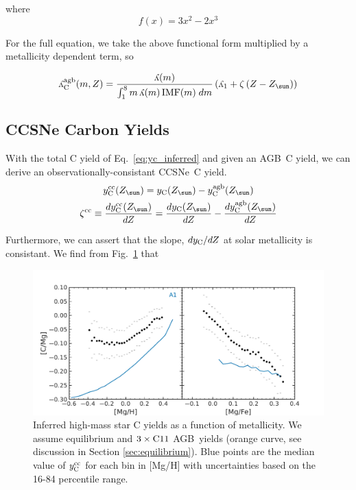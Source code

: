 \documentclass[fleqn,usenatbib]{mnras}
\newcommand{\agb}{AGB}
\newcommand{\cc}{CCSNe}
\newcommand{\Yct}{\ensuremath{y_{\rm C}}}
\newcommand{\Ycc}{\ensuremath{y_{\rm C}^{\rm cc}}}
\newcommand{\Ycagb}{\ensuremath{y_{\rm C}^{\rm agb}}}
\newcommand{\y}{\ensuremath{\rotatebox[origin=B,y=0.5ex]{180}{y}}}
\newcommand{\Zo}{%
    \ifmmode Z_{\sun}%
    \else $Z_{\sun}$%
    \fi}
\begin{document}
where 
\begin{equation}
    f(x) = 3x^2 - 2x^3
\end{equation}

For the full equation, we take the above functional form multiplied by a
metallicity dependent term, so 

\begin{equation}
    \y_{\rm C}^{\rm agb}(m, Z) = \frac{\y(m)}{\int_1^8 m\,\y(m)\,{\rm IMF}(m)\;dm} 
    \left(\y_1 + \zeta \left(Z-\Zo\right) \right)
\end{equation}



\subsection{CCSNe Carbon Yields}
With the total C yield of Eq.~\ref{eq:yc_inferred} and given an \agb\ C yield, we can derive an observationally-consistant \cc\ C yield.
\begin{subequations}
    \begin{gather}
        \Ycc(\Zo) = \Yct(\Zo) - \Ycagb(\Zo)\\
        \zeta^{\rm cc} \equiv \frac{d\Ycc(\Zo)}{dZ} = \frac{d\Yct(\Zo)}{dZ} - \frac{d\Ycagb(\Zo)}{dZ}
    \end{gather}
\end{subequations}

Furthermore, we can assert that the slope, $d \Yct / dZ$ at solar metallicity is consistant. We find from Fig.~\ref{fig:analytic} that 



\begin{figure}
    \centering
    \includegraphics[width=\columnwidth]{analytic.pdf}
    \caption[Reverse-Fit Yields]{Inferred high-mass star C yields as a function of metallicity. We assume equilibrium and $3\times {\rm C11}$ \agb\ yields (orange curve, see discussion in Section \ref{sec:equilibrium}). Blue points are the median value of $\Ycc$ for each bin in [Mg/H] with uncertainties based on the 16-84 percentile range.
    }
    \label{fig:analytic}
\end{figure}
\end{document}
